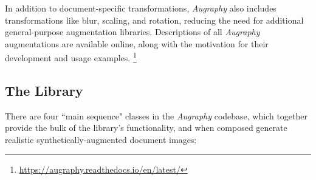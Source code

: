 \documentclass[runningheads]{llncs}
\begin{document}
\begin{table}
    \centering
    \caption{Individual \emph{Augraphy} augmentations for each augmentation phase, in suggested position within a pipeline. Augmentations that work well in more than one phase are listed in the last column.}
    \label{tab:augmentations}
\end{table}

In addition to document-specific transformations, \emph{Augraphy} also includes transformations like blur, scaling, and rotation, reducing the need for additional general-purpose augmentation libraries.
Descriptions of all \emph{Augraphy} augmentations are available online, along with the motivation for their development and usage examples. \footnote{\url{https://augraphy.readthedocs.io/en/latest/}}

\subsection{The Library}
There are four ``main sequence" classes in the \emph{Augraphy} codebase, which together provide the bulk of the library's functionality, and when composed generate realistic synthetically-augmented document images:
\end{document}
